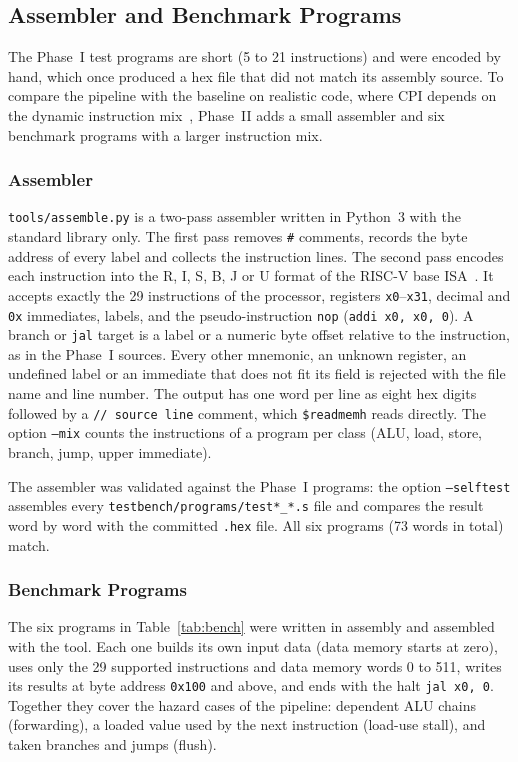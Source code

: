 \subsection{Assembler and Benchmark Programs}
The Phase~I test programs are short (5 to 21 instructions) and were encoded by
hand, which once produced a hex file that did not match its assembly source. To
compare the pipeline with the baseline on realistic code, where CPI depends on
the dynamic instruction mix~\cite{kapishHennessyQA}, Phase~II adds a small
assembler and six benchmark programs with a larger instruction mix.

\subsubsection{Assembler}
\texttt{tools/assemble.py} is a two-pass assembler written in Python~3 with the
standard library only. The first pass removes \texttt{\#} comments, records the
byte address of every label and collects the instruction lines. The second pass
encodes each instruction into the R, I, S, B, J or U format of the RISC-V base
ISA~\cite{kapishRVSpec,kapishPattersonRV}. It accepts exactly the 29 instructions
of the processor, registers \texttt{x0}--\texttt{x31}, decimal and \texttt{0x}
immediates, labels, and the pseudo-instruction \texttt{nop}
(\texttt{addi x0, x0, 0}). A branch or \texttt{jal} target is a label or a
numeric byte offset relative to the instruction, as in the Phase~I sources.
Every other mnemonic, an unknown register, an undefined label or an immediate
that does not fit its field is rejected with the file name and line number. The
output has one word per line as eight hex digits followed by a
\texttt{//~source line} comment, which \texttt{\$readmemh} reads directly.
The option \texttt{--mix} counts the instructions of a program per class (ALU,
load, store, branch, jump, upper immediate).

The assembler was validated against the Phase~I programs: the option
\texttt{--selftest} assembles every \texttt{testbench/programs/test*\_*.s} file and
compares the result word by word with the committed \texttt{.hex} file. All six
programs (73 words in total) match.

\subsubsection{Benchmark Programs}
The six programs in Table~\ref{tab:bench} were written in assembly and
assembled with the tool. Each one builds its own input data (data memory starts
at zero), uses only the 29 supported instructions and data memory words 0 to
511, writes its results at byte address \texttt{0x100} and above, and ends with
the halt \texttt{jal x0, 0}. Together they cover the hazard cases of the
pipeline: dependent ALU chains (forwarding), a loaded value used by the next
instruction (load-use stall), and taken branches and jumps (flush).

